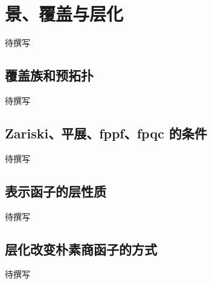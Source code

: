
% 
% 

\section{景、覆盖与层化}
\label{g5:sec:1603}

待撰写

\subsection{覆盖族和预拓扑}
\label{g5:subsec:1603:01}
待撰写

\subsection{Zariski、平展、fppf、fpqc 的条件}
\label{g5:subsec:1603:02}
待撰写

\subsection{表示函子的层性质}
\label{g5:subsec:1603:03}
待撰写

\subsection{层化改变朴素商函子的方式}
\label{g5:subsec:1603:04}
待撰写
